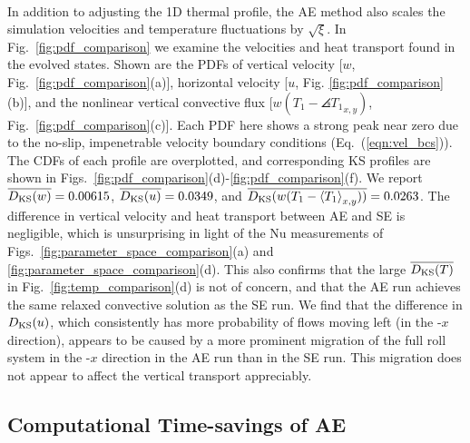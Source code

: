 \newpage$\,$\newpage


In addition to adjusting the 1D thermal profile, the AE method also scales the
simulation velocities and temperature fluctuations by $\sqrt{\xi}$. 
In Fig.~\ref{fig:pdf_comparison}
we examine the velocities and heat transport found in the evolved states.
Shown are the PDFs of 
vertical velocity [$w$, Fig.~\ref{fig:pdf_comparison}(a)], horizontal velocity [$u$, Fig. \ref{fig:pdf_comparison}(b)],
and the nonlinear vertical convective flux [$w(T_1 - \angles{T_1}_{x,y})$, Fig.~\ref{fig:pdf_comparison}(c)]. 
Each PDF here shows a strong peak near zero due to the no-slip, impenetrable
velocity boundary conditions (Eq.~(\ref{eqn:vel_bcs})).
The CDFs of each profile are overplotted, and corresponding KS profiles are
shown in Figs.~\ref{fig:pdf_comparison}(d)-\ref{fig:pdf_comparison}(f).  We report
$\overline{D_\text{KS}(w)} = 0.00615$, $\overline{D_\text{KS}(u)} = 0.0349$,
and $\overline{D_\text{KS}(w(T_1 - \left\langle T_1 \right\rangle_{x,y}))} = 0.0263$.
The difference in vertical velocity
and heat transport between AE and SE is negligible, which is unsurprising in light of
the Nu measurements of Figs.~\ref{fig:parameter_space_comparison}(a) and \ref{fig:parameter_space_comparison}(d).
This also confirms that the large $\overline{D_\text{KS}(T)}$ in Fig.~\ref{fig:temp_comparison}(d) is
not of concern, and that the AE run achieves the same relaxed convective solution
as the SE run.
We find that the difference in $D_{\text{KS}}(u)$, which consistently has more probability
of flows moving left (in the -$x$ direction), appears to be caused by a more prominent migration 
of the full roll system in the -$x$ direction in the AE run than in the SE run. 
This migration does not appear to affect the vertical transport appreciably.


\subsection{Computational Time-savings of AE}
\label{sec:speedups}

